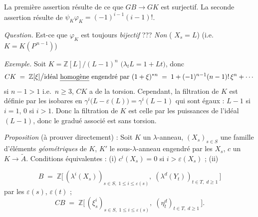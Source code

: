 \documentclass[11pt,a4paper]{article}
\begin{document}
La première assertion résulte de ce que $GB \to GK$ est surjectif. La
seconde assertion résulte de $\psi_{K}\varphi_{K} = (-1)^{i-1}(i-1)!$.

\emph{Question.} Est-ce que $\varphi_{K}$ est toujours
\emph{bijectif} ??? \emph{Non} (\ill{} \ill{}  $X_{s} = L$)
(i.e. $K = K(P^{\,n-1})$)

\emph{Exemple.} Soit\struck{\ill{}} $K = \mathbb{Z}[L]/(L-1)^{n}$
\struck{\ill{}} $\bigl(\lambda_{t}L = 1 + Lt\bigr)$, donc
\[
  CK \;=\; \mathbb{Z}[\xi] \big/ \text{idéal \uncertain{homogène} engendré par }
  (1+\xi)^{*n} \;=\; 1 + (-1)^{n-1}(n-1)!\,\xi^{n} + \cdots
\]
 si $n-1 > 1$ i.e.\ $n \geqslant 3$, $CK$ a de la torsion.
Cependant,  la filtration de $K$ est définie par les
 isobares en
$\gamma^{i}\bigl(L - \varepsilon(L)\bigr) = \gamma^{i}(L-1)$ qui sont
\struck{\ill{}} égaux : $L-1$ si $i = 1$, $0$ si $i > 1$. Donc la
filtration de $K$ est celle par les puissances de l'idéal
 $(L-1)$, donc le gradué associé est sans torsion.


\emph{Proposition} (à prouver directement) : Soit $K$ un $\lambda$-anneau,
$(X_{s})_{s \in S}$ une famille d'éléments \emph{géométriques} de
$K$, $K'$ le sous-$\lambda$-anneau engendré par les $X_{s}$, $c$ un 
$K \to \widetilde{A}$. Conditions équivalentes :
(i) $c^{i}(X_{s}) = 0$ si $i > \varepsilon(X_{s})$ ; (ii)


\[
  B \;=\; \mathbb{Z}\bigl[\,(\lambda^{i}(X_{s}))_{s \in S,\; 1 \leqslant i \leqslant \varepsilon(s)},\;
  (\lambda^{d}(Y_{t}))_{t \in T,\; d \geqslant 1}\,\bigr]
\]
  par les $\varepsilon(s)$,
$\varepsilon(t)$ ;
\[
  CB \;=\; \mathbb{Z}\bigl[\,(\xi^{i}_{s})_{s \in S,\; 1 \leqslant i \leqslant \varepsilon(s)},\;
  (\eta^{d}_{t})_{t \in T,\; d \geqslant 1}\,\bigr] .
\]
\end{document}
